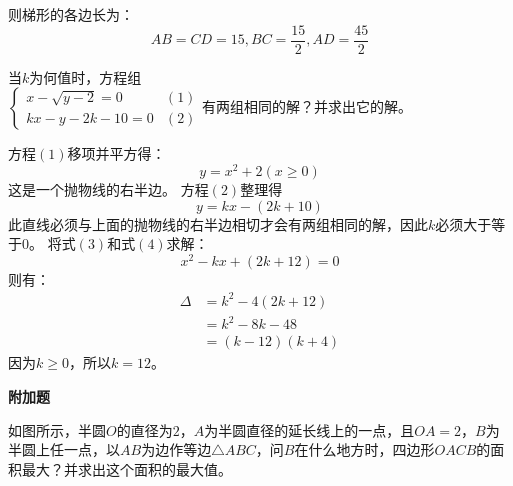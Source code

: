 \documentclass[answers]{exam}
\begin{document}
\begin{questions}
\begin{solution}
		则梯形的各边长为：
		\begin{equation*}
			AB = CD = 15, BC = \frac{15}{2}, AD = \frac{45}{2}
		\end{equation*}
	\end{solution}

	\question 当$k$为何值时，方程组 \begin{math}
		\left\{
		\begin{array}{lr}
			x - \sqrt{y - 2} = 0 & (1) \\
			kx - y - 2k - 10 = 0 & (2)
		\end{array}
		\right. 有两组相同的解？并求出它的解。
	\end{math}

	\begin{solution}
		方程$(1)$移项并平方得：
		\begin{equation*}
			y=x^2 + 2 (x \geqslant 0) \tag{3}
		\end{equation*}
		这是一个抛物线的右半边。
		方程$(2)$整理得
		\begin{equation*}
			y=kx - (2k + 10) \tag{4}
		\end{equation*}
		此直线必须与上面的抛物线的右半边相切才会有两组相同的解，因此$k$必须大于等于0。
		将式$(3)$和式$(4)$求解：
		\begin{equation*}
			x^2 - kx + (2k + 12) = 0
		\end{equation*}
		则有：
		\begin{align*}
			\Delta & = k^2 - 4(2k + 12) \\
			       & = k^2 - 8k - 48    \\
			       & = (k-12)(k+4)
		\end{align*}
		因为$k\geqslant 0$，所以$k=12$。
	\end{solution}

	\begin{center}
		\textbf{附加题}
	\end{center}

	\question
	如图所示，半圆$O$的直径为$2$，$A$为半圆直径的延长线上的一点，且$OA=2$，$B$为半圆上任一点，以$AB$为边作等边$\triangle{ABC}$，问$B$在什么地方时，四边形$OACB$的面积最大？并求出这个面积的最大值。
	\begin{figure*}[ht]
		\centering
\end{figure*}
\end{questions}
\end{document}
